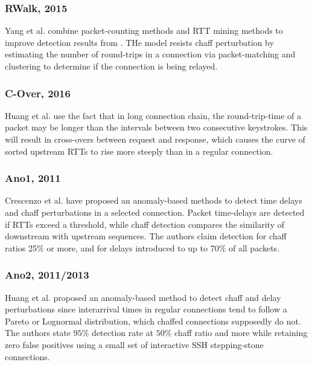 \subsubsection{RWalk, 2015}


Yang et al. \cite{yang2015rtt} combine packet-counting methods and RTT mining methods to improve detection results from \cite{yang2007mining}. 
THe model resists chaff perturbation by estimating the number of round-trips in a connection via packet-matching and clustering to determine if the connection is being relayed.
\subsubsection{C-Over, 2016}

Huang et al. \cite{huang2016detecting} use the fact that in long connection chain, the round-trip-time of a packet may be longer than the intervals between two consecutive keystrokes. 
This will result in cross-overs between request and response, which causes the curve of sorted upstream RTTs to rise more steeply than in a regular connection.

\subsubsection{Ano1, 2011}

Crescenzo et al. \cite{di2011detecting} have proposed an anomaly-based methods to detect time delays and chaff perturbations in a selected connection. 
Packet time-delays are detected if RTTs exceed a threshold, while chaff detection compares the similarity of downstream with upstream sequences.
The authors claim detection for chaff ratios 25\% or more, and for delays introduced to up to 70\% of all packets.

\subsubsection{Ano2, 2011/2013}
Huang et al. \cite{huang2011detecting,ding2013detecting} proposed an anomaly-based method to detect chaff and delay perturbations since interarrival times in regular connections tend to follow a Pareto or Lognormal distribution, which chaffed connections supposedly do not.
The authors state $95\%$ detection rate at $50\%$ chaff ratio and more while retaining zero false positives using a small set of interactive SSH stepping-stone connections.

